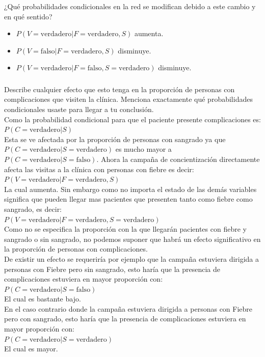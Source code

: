 \documentclass[12pt]{article}
\begin{document}
\subsubsection{} ¿Qué probabilidades condicionales en la red se modifican debido a este cambio y en qué sentido?
\begin{itemize}
	\item $P(V=\text{verdadero}|F=\text{verdadero},S)$ aumenta.
	\item $P(V=\text{falso}|F=\text{verdadero},S)$ disminuye.
	\item $P(V=\text{verdadero}|F=\text{falso},S=\text{verdadero})$ disminuye.
\end{itemize}
\subsubsection{} Describe cualquier efecto que esto tenga en la proporción de personas con complicaciones que visiten la clínica. Menciona exactamente qué probabilidades condicionales usaste para llegar a tu conclusión.\\

Como la probabilidad condicional para que el paciente presente complicaciones es:\\ $P(C=\text{verdadero}|S)$\\
Esta se ve afectada por la proporción de personas con sangrado ya que $P(C=\text{verdadero}|S=\text{verdadero})$ es mucho mayor a $P(C=\text{verdadero}|S=\text{falso})$.
Ahora la campaña de concientización directamente afecta las visitas a la clínica con personas con fiebre es decir:\\ $P(V=\text{verdadero}|F=\text{verdadero},S)$\\
La cual aumenta. Sin embargo como no importa el estado de las demás variables significa que pueden llegar mas pacientes que presenten tanto como fiebre como sangrado, es decir:\\
$P(V=\text{verdadero}|F=\text{verdadero},S=\text{verdadero})$\\
Como no se especifica la proporción con la que llegarán pacientes con fiebre y sangrado o sin sangrado, no podemos suponer que habrá un efecto significativo en la proporción de personas con complicaciones.\\
De existir un efecto se requeriría por ejemplo que la campaña estuviera dirigida a personas con Fiebre pero sin sangrado, esto haría que la presencia de complicaciones estuviera en mayor proporción con:\\
$P(C=\text{verdadero}|S=\text{falso})$\\
El cual es bastante bajo.\\
En el caso contrario donde la campaña estuviera dirigida a personas con Fiebre pero con sangrado, esto haría que la presencia de complicaciones estuviera en mayor proporción con:\\
$P(C=\text{verdadero}|S=\text{verdadero})$\\
El cual es mayor.\\
\end{document}
